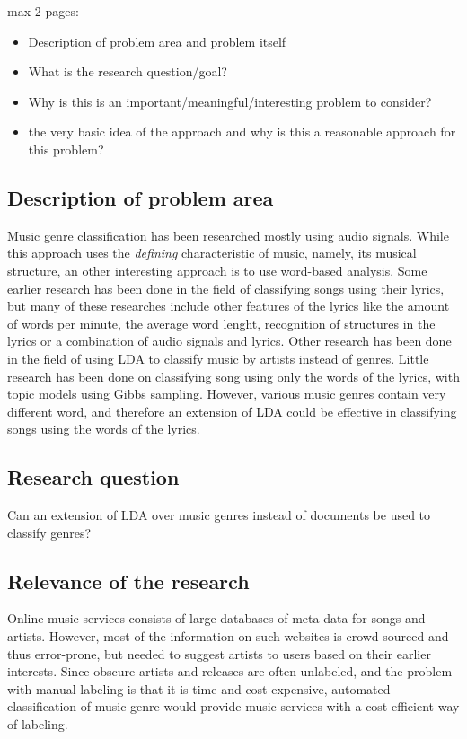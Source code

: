 max 2 pages:
\begin{itemize}
\item Description of problem area and problem itself
\item What is the research question/goal?
\item Why is this is an important/meaningful/interesting problem to consider?
\item the very basic idea of the approach and why is this a reasonable approach for this problem?
\end{itemize}

\subsection{Description of problem area}
Music genre classification has been researched mostly using audio signals\cite{audio_classification}. While this approach uses the \textit{defining} characteristic of music, namely, its musical structure, an other interesting approach is to use word-based analysis. Some earlier research has been done in the field of classifying songs using their lyrics, but many of these researches include other features of the lyrics like the amount of words per minute, the average word lenght\cite{mayeraudiolyrics}, recognition of structures in the lyrics\cite{maxwellgenome} or a combination of audio signals and lyrics\cite{mayeraudiolyrics}. Other research has been done in the field of using LDA to classify music by artists instead of genres\cite{liartists}. Little research has been done on classifying song using only the words of the lyrics\cite{stateoftheart}, with topic models using Gibbs sampling. However, various music genres contain very different word, and therefore an extension of LDA could be effective in classifying songs using the words of the lyrics.

\subsection{Research question}
Can an extension of LDA over music genres instead of documents be used to classify genres?

\subsection{Relevance of the research}
Online music services consists of large databases of meta-data for songs and artists. However, most of the information on such websites is crowd sourced and thus error-prone, but needed to suggest artists to users based on their earlier interests. Since obscure artists and releases are often unlabeled, and the problem with manual labeling is that it is time and cost expensive, automated classification of music genre would provide music services with a cost efficient way of labeling.

